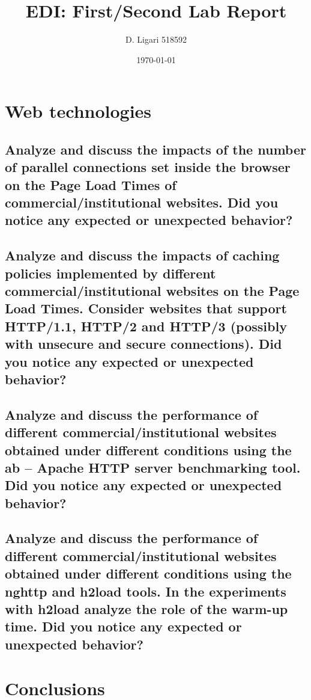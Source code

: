 \documentclass[eng]{class}
\title{EDI: First/Second Lab Report}
\author[1]{D. Ligari 518592}
\affil[1]{University of Pavia, Department of Computer Engineering (Data Science), Pavia, Italy}
\date{\today}
\begin{document}
\maketitle
\tableofcontents
\thispagestyle{FirstPage}
\section{Web technologies}
\subsection*{Analyze and discuss the impacts of the number of parallel connections set inside the browser
  on the Page Load Times of commercial/institutional websites. Did you notice any expected or
  unexpected behavior?}

\pagestyle{OtherPage}

\subsection*{Analyze and discuss the impacts of caching policies implemented by different
  commercial/institutional websites on the Page Load Times. Consider websites that support
  HTTP/1.1, HTTP/2 and HTTP/3 (possibly with unsecure and secure connections). Did you notice
  any expected or unexpected behavior?}


\subsection*{Analyze and discuss the performance of different commercial/institutional websites obtained
  under different conditions using the ab – Apache HTTP server benchmarking tool. Did you
  notice any expected or unexpected behavior?}

\subsection*{Analyze and discuss the performance of different commercial/institutional websites obtained
  under different conditions using the nghttp and h2load tools. In the experiments with
  h2load analyze the role of the warm-up time. Did you notice any expected or unexpected
  behavior?}


\section{Conclusions}
\end{document}
